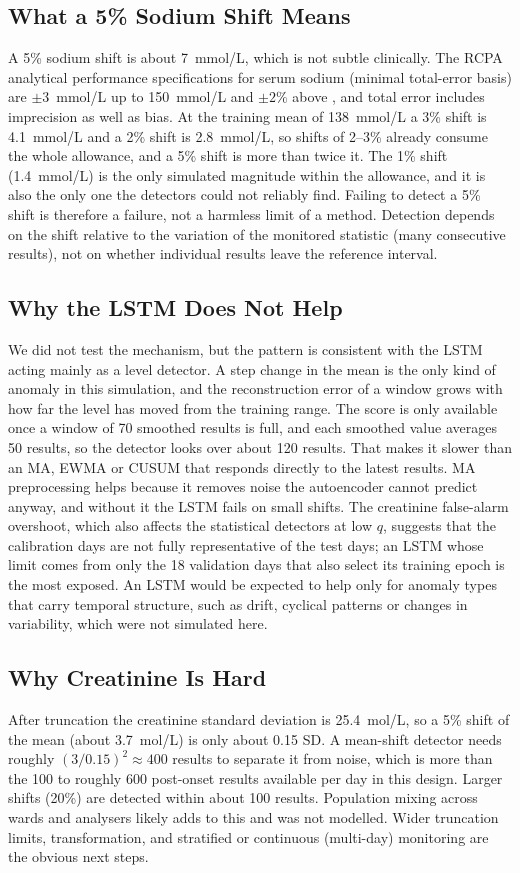 \documentclass[conference]{IEEEtran}
\begin{document}
\subsection{What a 5\% Sodium Shift Means}
A 5\% sodium shift is about 7~mmol/L, which is not subtle clinically. The RCPA analytical performance specifications for serum sodium (minimal total-error basis) are $\pm3$~mmol/L up to 150~mmol/L and $\pm2\%$ above \cite{RCPA}, and total error includes imprecision as well as bias. At the training mean of 138~mmol/L a 3\% shift is 4.1~mmol/L and a 2\% shift is 2.8~mmol/L, so shifts of 2--3\% already consume the whole allowance, and a 5\% shift is more than twice it. The 1\% shift (1.4~mmol/L) is the only simulated magnitude within the allowance, and it is also the only one the detectors could not reliably find. Failing to detect a 5\% shift is therefore a failure, not a harmless limit of a method. Detection depends on the shift relative to the variation of the monitored statistic (many consecutive results), not on whether individual results leave the reference interval.

\subsection{Why the LSTM Does Not Help}
We did not test the mechanism, but the pattern is consistent with the LSTM acting mainly as a level detector. A step change in the mean is the only kind of anomaly in this simulation, and the reconstruction error of a window grows with how far the level has moved from the training range. The score is only available once a window of 70 smoothed results is full, and each smoothed value averages 50 results, so the detector looks over about 120 results. That makes it slower than an MA, EWMA or CUSUM that responds directly to the latest results. MA preprocessing helps because it removes noise the autoencoder cannot predict anyway, and without it the LSTM fails on small shifts. The creatinine false-alarm overshoot, which also affects the statistical detectors at low $q$, suggests that the calibration days are not fully representative of the test days; an LSTM whose limit comes from only the 18 validation days that also select its training epoch is the most exposed. An LSTM would be expected to help only for anomaly types that carry temporal structure, such as drift, cyclical patterns or changes in variability, which were not simulated here.

\subsection{Why Creatinine Is Hard}
After truncation the creatinine standard deviation is 25.4~\textmu mol/L, so a 5\% shift of the mean (about 3.7~\textmu mol/L) is only about 0.15 SD. A mean-shift detector needs roughly $(3/0.15)^2\approx 400$ results to separate it from noise, which is more than the 100 to roughly 600 post-onset results available per day in this design. Larger shifts (20\%) are detected within about 100 results. Population mixing across wards and analysers likely adds to this and was not modelled. Wider truncation limits, transformation, and stratified or continuous (multi-day) monitoring are the obvious next steps.
\end{document}
